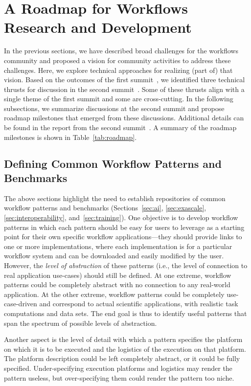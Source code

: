\section{A Roadmap for Workflows Research and Development}
\label{sec:roadmap}

In the previous sections, we have described broad challenges for the workflows community and proposed a vision for community activities to address these challenges. Here, we explore technical approaches for realizing (part of) that vision. Based on the outcomes of the first summit~\cite{ferreiradasilva2021wcs}, we identified three technical thrusts for discussion in the second summit~\cite{wcs2021technical}. Some of these thrusts align with a single theme of the first summit and some are cross-cutting. In the following subsections, we summarize discussions at the second summit and propose roadmap milestones that emerged from these discussions. Additional details can be found in the report from the second summit~\cite{wcs2021technical}. A summary of the roadmap milestones is shown in Table~\ref{tab:roadmap}.


\subsection{Defining Common Workflow Patterns and Benchmarks}

The above sections highlight the need to establish repositories of common workflow patterns and benchmarks (Sections~\ref{sec:ai}, \ref{sec:exascale}, \ref{sec:interoperability}, and~\ref{sec:training}). One objective is to develop workflow patterns in which each pattern should be easy for users to leverage as a starting point for their own specific workflow applications---they should provide links to one or more implementations, where each implementation is for a particular workflow system and can be downloaded and easily modified by the user. However, the \emph{level of abstraction} of these patterns (i.e., the level of connection to real application use-cases) should still be defined. At one extreme, workflow patterns could be completely abstract with no connection to any real-world application. At the other extreme, workflow patterns could be completely use-case-driven and correspond to actual scientific applications, with realistic task computations and data sets. The end goal is thus to identify useful patterns that span the spectrum of possible levels of abstraction. 

Another aspect is the level of detail with which a pattern specifies the platform on which it is to be executed and the logistics of the execution on that platform. The platform description could be left completely abstract, or it could be fully specified. Under-specifying execution platforms and logistics may render the pattern useless, but over-specifying them could render the pattern too niche.

